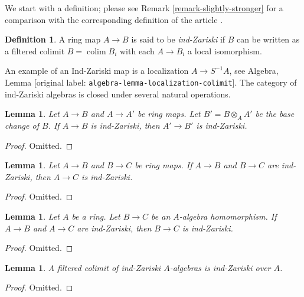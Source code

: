 \documentclass[10pt,a4paper]{article}
\theoremstyle{plain}
\newtheorem{lemma}[subsection]{Lemma}
\theoremstyle{definition}
\newtheorem{definition}[subsection]{Definition}
\theoremstyle{remark}
\numberwithin{equation}{subsection}
\def\colim{\mathop{\mathrm{colim}}\nolimits}
\begin{document}
\noindent
We start with a definition; please see Remark \ref{remark-slightly-stronger}
for a comparison with the corresponding definition of the article \cite{BS}.

\begin{definition}
\label{definition-ind-zariski}
A ring map $A \to B$ is said to be {\it ind-Zariski} if $B$ can be written
as a filtered colimit $B = \colim B_i$ with each $A \to B_i$ a local
isomorphism.
\end{definition}

\noindent
An example of an Ind-Zariski map is a localization $A \to S^{-1}A$, see
Algebra, Lemma \textnormal{[original label: \nolinkurl{algebra-lemma-localization-colimit}]}.
The category of ind-Zariski algebras is closed under several natural
operations.

\begin{lemma}
\label{lemma-base-change-ind-zariski}
Let $A \to B$ and $A \to A'$ be ring maps. Let $B' = B \otimes_A A'$
be the base change of $B$.
If $A \to B$ is ind-Zariski, then $A' \to B'$ is ind-Zariski.
\end{lemma}

\begin{proof}
Omitted.
\end{proof}

\begin{lemma}
\label{lemma-composition-ind-zariski}
Let $A \to B$ and $B \to C$ be ring maps. If $A \to B$ and $B \to C$
are ind-Zariski, then $A \to C$ is ind-Zariski.
\end{lemma}

\begin{proof}
Omitted.
\end{proof}

\begin{lemma}
\label{lemma-ind-zariski-permanence}
Let $A$ be a ring. Let $B \to C$ be an $A$-algebra homomorphism.
If $A \to B$ and $A \to C$ are ind-Zariski, then $B \to C$
is ind-Zariski.
\end{lemma}

\begin{proof}
Omitted.
\end{proof}

\begin{lemma}
\label{lemma-ind-ind-zariski}
A filtered colimit of ind-Zariski $A$-algebras is ind-Zariski over $A$.
\end{lemma}

\begin{proof}
Omitted.
\end{proof}
\end{document}
